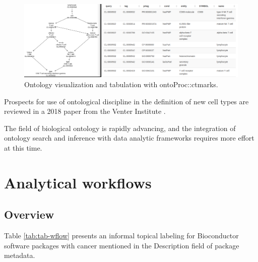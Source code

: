 \documentclass[graybox]{svmult}
\begin{document}
\begin{figure}
\includegraphics[width=1\linewidth,]{ontoPair} \caption{Ontology visualization and tabulation with ontoProc::ctmarks.}\label{fig:ontopair}
\end{figure}

Prospects for use of ontological discipline in the
definition of new cell types are reviewed in a 2018
paper from the Venter Institute \cite{Aevermann2018}.

The field of biological ontology is rapidly advancing,
and the integration of ontology search and inference
with data analytic frameworks requires more effort at this time.



\section{Analytical workflows}\label{analytical-workflows}


\subsection{Overview}\label{overview}

Table \ref{tab:tab-wflow} presents an informal topical
labeling for Bioconductor software packages with
cancer mentioned in the Description field of package
metadata.
\end{document}
